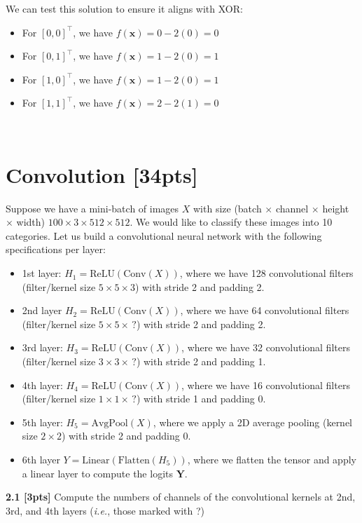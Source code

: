 \documentclass{article}
\begin{document}
{We can test this solution to ensure it aligns with XOR:
\begin{itemize}
    \item For $[0,0]^{\top}$, we have $f(\mathbf{x})= 0-2(0)= 0$ 
    \item For $[0,1]^{\top}$, we have $f(\mathbf{x})= 1-2(0)= 1$
    \item For $[1,0]^{\top}$, we have $f(\mathbf{x})= 1-2(0)= 1$
    \item For $[1,1]^{\top}$, we have $f(\mathbf{x})= 2-2(1)= 0$
\end{itemize}
}\\

\section{Convolution [34pts]}
\noindent
Suppose we have a mini-batch of images $X$ with size (batch $\times$ channel $\times$ height $\times$ width) $100 \times 3 \times 512 \times 512$. We would like to classify these images into 10 categories. Let us build a convolutional neural network with the following specifications per layer:
\begin{itemize}
    \item 1st layer: $H_1 = \text{ReLU}(\text{Conv}(X))$, where we have 128 convolutional filters (filter/kernel size $5 \times 5 \times 3$) with stride 2 and padding 2.
    \item 2nd layer $H_2 = \text{ReLU}(\text{Conv}(X))$, where we have 64 convolutional filters (filter/kernel size $5 \times 5 \times \, ?$) with stride 2 and padding 2.
    \item 3rd layer: $H_3 = \text{ReLU}(\text{Conv}(X))$, where we have 32 convolutional filters (filter/kernel size $3 \times 3 \times \, ?$) with stride 2 and padding 1.
    \item 4th layer: $H_4 = \text{ReLU}(\text{Conv}(X))$, where we have 16 convolutional filters (filter/kernel size $1 \times 1 \times \, ?$) with stride 1 and padding 0.
    \item 5th layer: $H_5 = \text{AvgPool}(X)$, where we apply a 2D average pooling (kernel size $2 \times 2$) with stride 2 and padding 0.
    \item 6th layer $Y = \text{Linear}(\text{Flatten}(H_5))$, where we flatten the tensor and apply a linear layer to compute the logits $\mathbf{Y}$.
\end{itemize}

\noindent
\textbf{2.1 [3pts]} Compute the numbers of channels of the convolutional kernels at 2nd, 3rd, and 4th layers (\textit{i.e.}, those marked with ?)\\
\end{document}
